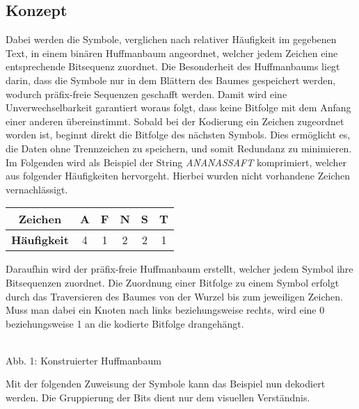 \documentclass[course=erap]{aspdoc}
\begin{document}
\subsection{Konzept}
Dabei werden die Symbole, verglichen nach relativer Häufigkeit im gegebenen Text, in einem binären Huffmanbaum angeordnet, welcher jedem Zeichen eine entsprechende Bitsequenz zuordnet. Die Besonderheit des Huffmanbaums liegt darin, dass die Symbole nur in dem Blättern des Baumes gespeichert werden, wodurch präfix-freie Sequenzen geschafft werden. Damit wird eine Unverwechselbarkeit garantiert woraus folgt, dass keine Bitfolge mit dem Anfang einer anderen übereinstimmt. Sobald bei der Kodierung ein Zeichen zugeordnet worden ist, beginnt direkt die Bitfolge des nächsten Symbols. Dies ermöglicht es, die Daten ohne Trennzeichen zu speichern, und somit Redundanz zu minimieren.\\
Im Folgenden wird als Beispiel der String \textit{ANANASSAFT} komprimiert, welcher aus folgender Häufigkeiten hervorgeht. Hierbei wurden nicht vorhandene Zeichen vernachlässigt.
\begin{center}
    \begin{tabular}{ c|c|c|c|c|c }
     \textbf{Zeichen} & A & F & N & S & T \\
     \hline
     \textbf{Häufigkeit} & 4 & 1 & 2 & 2 & 1 \\
    \end{tabular}
\end{center}
Daraufhin wird der präfix-freie Huffmanbaum erstellt, welcher jedem Symbol ihre Bitsequenzen zuordnet. Die Zuordnung einer Bitfolge zu einem Symbol erfolgt durch das Traversieren %
des Baumes von der Wurzel bis zum jeweiligen Zeichen. Muss man dabei ein Knoten nach links beziehungsweise rechts, wird eine 0 beziehungsweise 1 an die kodierte Bitfolge drangehängt.
\begin{center}
    \\Abb. 1: Konstruierter Huffmanbaum
    \label{fig:my_label}
\end{center}
Mit der folgenden Zuweisung der Symbole kann das Beispiel nun dekodiert werden. Die Gruppierung der Bits dient nur dem visuellen Verständnis.
\end{document}
